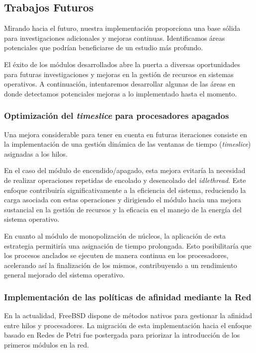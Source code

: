 \subsection{Trabajos Futuros}
Mirando hacia el futuro, nuestra implementación proporciona una base sólida para investigaciones adicionales y mejoras continuas. Identificamos áreas potenciales que podrían beneficiarse de un estudio más profundo.\par

El éxito de los módulos desarrollados abre la puerta a diversas oportunidades para futuras investigaciones y mejoras en la gestión de recursos en sistemas operativos. A continuación, intentaremos desarrollar algunas de las áreas en donde detectamos potenciales mejoras a lo implementado hasta el momento.\par

\subsubsection{Optimización del \textit{timeslice} para procesadores apagados}
Una mejora considerable para tener en cuenta en futuras iteraciones consiste en la implementación de una gestión dinámica de las ventanas de tiempo (\textit{timeslice}) asignadas a los hilos.\par

En el caso del módulo de encendido/apagado, esta mejora evitaría la necesidad de realizar operaciones repetidas de encolado y desencolado del \textit{idlethread}. Este enfoque contribuiría significativamente a la eficiencia del sistema, reduciendo la carga asociada con estas operaciones y dirigiendo el módulo hacia una mejora sustancial en la gestión de recursos y la eficacia en el manejo de la energía del sistema operativo.\par

En cuanto al módulo de monopolización de núcleos, la aplicación de esta estrategia permitiría una asignación de tiempo prolongada. Esto posibilitaría que los procesos anclados se ejecuten de manera continua en los procesadores, acelerando así la finalización de los mismos, contribuyendo a un rendimiento general mejorado del sistema operativo.\par

\subsubsection{Implementación de las políticas de afinidad mediante la Red}
En la actualidad, FreeBSD dispone de métodos nativos para gestionar la afinidad entre hilos y procesadores. La migración de esta implementación hacia el enfoque basado en Redes de Petri fue postergada para priorizar la introducción de los primeros módulos en la red.\par

